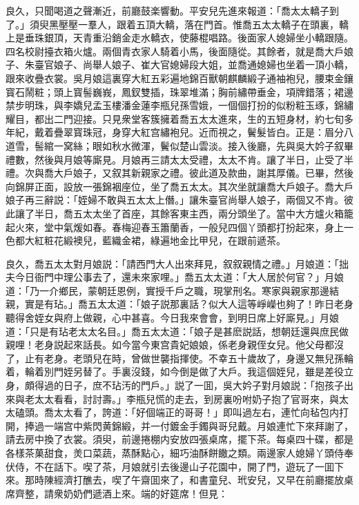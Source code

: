 良久，只聞喝道之聲漸近，前廳鼓楽響動。平安兒先進來報道：「喬太太轎子到了。」須臾黑壓壓一羣人，跟着五頂大轎，落在門首。惟喬五太太轎子在頭裏，轎上是垂珠銀頂，天青重沿銷金走水轎衣，使藤棍唱路。後面家人媳婦坐小轎跟隨。四名校尉擡衣箱火爐。兩個青衣家人騎着小馬，後面隨從。其餘者，就是喬大戶娘子、朱臺官娘子、尚舉人娘子、崔大官媳婦段大姐，並喬通媳婦也坐着一頂小轎，跟來收疊衣裳。吳月娘這裏穿大紅五彩遍地錦百獸朝麒麟緞子通袖袍兒，腰束金鑲寳石鬧粧；頭上寳髻巍峩，鳳釵雙插，珠翠堆滿；胸前繡帶垂金，項牌錯落；裙邊禁步明珠，與李嬌兒孟玉樓潘金蓮李瓶兒孫雪娥，一個個打扮的似粉粧玉琢，錦繡耀目，都出二門迎接。只見衆堂客簇擁着喬五太太進來，生的五短身材，約七旬多年紀，戴着疊翠寳珠冠，身穿大紅宫繡袍兒。近而視之，鬢髮皆白。正是：眉分八道雪，髻綰一窝絲；眼如秋水微渾，鬢似楚山雲淡。接入後廳，先與吳大妗子叙畢禮數，然後與月娘等廝見。月娘再三請太太受禮，太太不肯。讓了半日，止受了半禮。次與喬大戶娘子，又叙其新親家之禮。彼此道及款曲，謝其厚儀。已畢，然後向錦屏正面，設放一張錦裀座位，坐了喬五太太。其次坐就讓喬大戶娘子。喬大戶娘子再三辭説：「姪婦不敢與五太太上僭。」讓朱臺官尚舉人娘子，兩個又不肯。彼此讓了半日，喬五太太坐了首座，其餘客東主西，兩分頭坐了。當中大方爐火箱籠起火來，堂中氣煖如春。春梅迎春玉簫蘭香，一般兒四個丫頭都打扮起來，身上一色都大紅粧花緞襖兒，藍織金裙，綠遍地金比甲兒，在跟前遞茶。

良久，喬五太太對月娘説：「請西門大人出來拜見，叙叙親情之禮。」月娘道：「拙夫今日衙門中理公事去了，還未來家哩。」喬五太太道：「大人居於何官？」月娘道：「乃一介鄉民，蒙朝廷恩例，實授千戶之職，現掌刑名。寒家與親家那邊結親，實是有玷。」喬五太太道：「娘子説那裏話？似大人這等崢嶸也夠了！昨日老身聽得舍姪女與府上做親，心中甚喜。今日我來會會，到明日席上好廝見。」月娘道：「只是有玷老太太名目。」喬五太太道：「娘子是甚麽説話，想朝廷還與庶民做親哩！老身説起來話長。如今當今東宫貴妃娘娘，係老身親侄女兒。他父母都沒了，止有老身。老頭兒在時，曾做世襲指揮使。不幸五十歲故了，身邊又無兒孫輪着，輪着別門姪另替了。手裏沒錢，如今倒是做了大戶。我這個姪兒，雖是差役立身，頗得過的日子，庶不玷汚的門戶。」説了一囬，吳大妗子對月娘説：「抱孩子出來與老太太看看，討討壽。」李瓶兒慌的走去，到房裏吩咐奶子抱了官哥來，與太太磕頭。喬太太看了，誇道：「好個端正的哥哥！」即叫過左右，連忙向毡包内打開，捧過一端宫中紫閃黄錦緞，并一付鍍金手鐲與哥兒戴。月娘連忙下來拜謝了，請去房中換了衣裳。須臾，前邊捲棚内安放四張桌席，擺下茶。每桌四十碟，都是各樣茶菓甜食，羙口菜蔬，蒸酥點心，細巧油酥餅饊之類。兩邊家人媳婦丫頭侍奉伏侍，不在話下。喫了茶，月娘就引去後邊山子花園中，開了門，遊玩了一囬下來。那時陳經濟打醮去，喫了午齋囬來了，和書童兒、玳安兒，又早在前廳擺放桌席齊整，請衆奶奶們遞酒上來。端的好筵席！但見：

